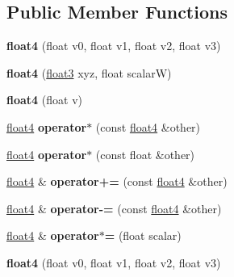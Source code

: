 \subsection*{Public Member Functions}
\begin{DoxyCompactItemize}
\item 
\mbox{\label{structfloat4_adb219b38e74193fe2e98ec7964e07d55}} 
{\bfseries float4} (float v0, float v1, float v2, float v3)
\item 
\mbox{\label{structfloat4_af3ff0e4ce918917edbddb986492ec06b}} 
{\bfseries float4} (\hyperlink{structfloat3}{float3} xyz, float scalarW)
\item 
\mbox{\label{structfloat4_a25dc2c3d9a1346d00a6cd0b3151678de}} 
{\bfseries float4} (float v)
\item 
\mbox{\label{structfloat4_abe286c01f9d43ef28ee4e91a92decac8}} 
\hyperlink{structfloat4}{float4} {\bfseries operator$\ast$} (const \hyperlink{structfloat4}{float4} \&other)
\item 
\mbox{\label{structfloat4_a30e515d290f70a576587b2425afce6d5}} 
\hyperlink{structfloat4}{float4} {\bfseries operator$\ast$} (const float \&other)
\item 
\mbox{\label{structfloat4_a4731852308754d782778c50868140ab6}} 
\hyperlink{structfloat4}{float4} \& {\bfseries operator+=} (const \hyperlink{structfloat4}{float4} \&other)
\item 
\mbox{\label{structfloat4_a6c51914f994cd5c04edb6b47b28fb7f4}} 
\hyperlink{structfloat4}{float4} \& {\bfseries operator-\/=} (const \hyperlink{structfloat4}{float4} \&other)
\item 
\mbox{\label{structfloat4_ae3edbdfcd8ae9e66806e859fac1dc82e}} 
\hyperlink{structfloat4}{float4} \& {\bfseries operator$\ast$=} (float scalar)
\item 
\mbox{\label{structfloat4_adb219b38e74193fe2e98ec7964e07d55}} 
{\bfseries float4} (float v0, float v1, float v2, float v3)
\item 
\mbox{\label{structfloat4_af3ff0e4ce918917edbddb986492ec06b}} 

\end{DoxyCompactItemize}
